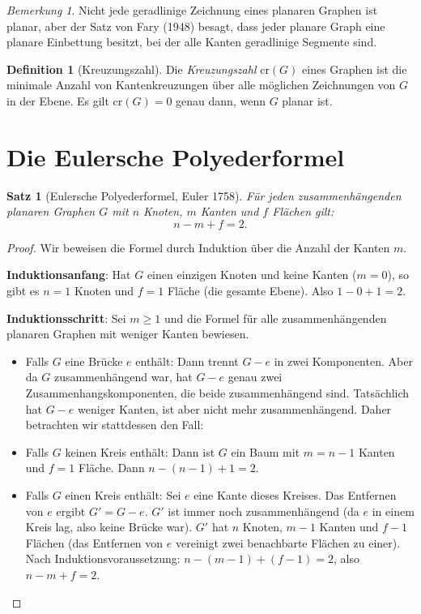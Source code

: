 ﻿\documentclass[a4paper,12pt,openany,oneside]{book}
\theoremstyle{definition}
\newtheorem{definition}{Definition}[chapter]
\theoremstyle{plain}
\newtheorem{satz}{Satz}[chapter]
\theoremstyle{remark}
\newtheorem{bemerkung}{Bemerkung}[chapter]
\begin{document}
\begin{bemerkung}
  Nicht jede geradlinige Zeichnung eines planaren Graphen ist planar, aber
  der Satz von Fary (1948) besagt, dass jeder planare Graph eine planare
  Einbettung besitzt, bei der alle Kanten geradlinige Segmente sind.
\end{bemerkung}

\begin{definition}[Kreuzungszahl]
  Die \emph{Kreuzungszahl} $\mathrm{cr}(G)$ eines Graphen ist die minimale
  Anzahl von Kantenkreuzungen \"uber alle m\"oglichen Zeichnungen von $G$ in
  der Ebene. Es gilt $\mathrm{cr}(G) = 0$ genau dann, wenn $G$ planar ist.
\end{definition}

\section{Die Eulersche Polyederformel}

\begin{satz}[Eulersche Polyederformel, Euler 1758]
  \label{satz:euler}
  F\"ur jeden zusammenh\"angenden planaren Graphen $G$ mit $n$ Knoten,
  $m$ Kanten und $f$ Fl\"achen gilt:
  \[
    n - m + f = 2.
  \]
\end{satz}

\begin{proof}
  Wir beweisen die Formel durch Induktion \"uber die Anzahl der Kanten $m$.

  \textbf{Induktionsanfang}: Hat $G$ einen einzigen Knoten und keine Kanten
  ($m = 0$), so gibt es $n = 1$ Knoten und $f = 1$ Fl\"ache (die gesamte
  Ebene). Also $1 - 0 + 1 = 2$. \checkmark

  \textbf{Induktionsschritt}: Sei $m \geq 1$ und die Formel f\"ur alle
  zusammenh\"angenden planaren Graphen mit weniger Kanten bewiesen.
  \begin{itemize}
    \item Falls $G$ eine Br\"ucke $e$ enth\"alt: Dann trennt $G - e$ in zwei
          Komponenten. Aber da $G$ zusammenh\"angend war, hat $G - e$ genau
          zwei Zusammenhangskomponenten, die beide zusammenh\"angend sind.
          Tats\"achlich hat $G - e$ weniger Kanten, ist aber nicht mehr
          zusammenh\"angend. Daher betrachten wir stattdessen den Fall:
    \item Falls $G$ keinen Kreis enth\"alt: Dann ist $G$ ein Baum mit
          $m = n-1$ Kanten und $f = 1$ Fl\"ache. Dann $n - (n-1) + 1 = 2$.
          \checkmark
    \item Falls $G$ einen Kreis enth\"alt: Sei $e$ eine Kante dieses Kreises.
          Das Entfernen von $e$ ergibt $G' = G - e$. $G'$ ist immer noch
          zusammenh\"angend (da $e$ in einem Kreis lag, also keine Br\"ucke
          war). $G'$ hat $n$ Knoten, $m-1$ Kanten und $f-1$ Fl\"achen (das
          Entfernen von $e$ vereinigt zwei benachbarte Fl\"achen zu einer).
          Nach Induktionsvoraussetzung: $n - (m-1) + (f-1) = 2$, also
          $n - m + f = 2$. \checkmark \qedhere
  \end{itemize}
\end{proof}
\end{document}
